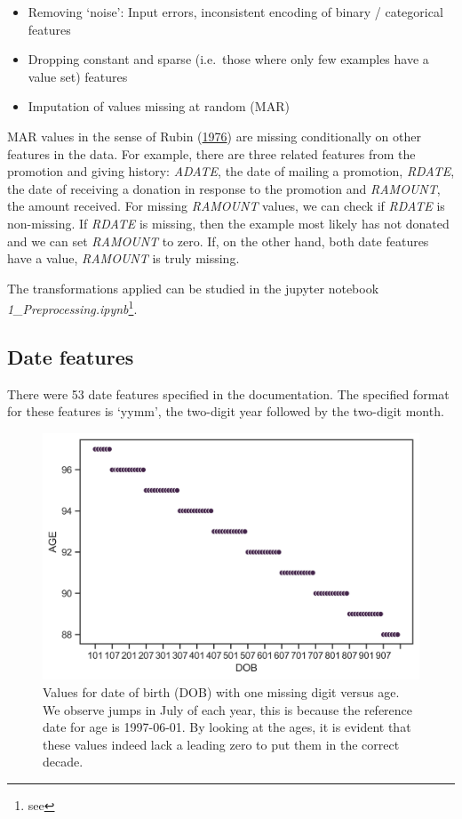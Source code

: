 \documentclass[
  11pt,
  a4paper,
  DIV=12,captions=tableheading,oneside]{scrbook}
\providecommand{\tightlist}{%
  \setlength{\itemsep}{0pt}\setlength{\parskip}{0pt}}
\providecommand{\tightlist}{%
  \setlength{\itemsep}{0pt}\setlength{\parskip}{0pt}}
\begin{document}
\begin{itemize}
\tightlist
\item
  Removing `noise': Input errors, inconsistent encoding of binary / categorical features
\item
  Dropping constant and sparse (i.e.~those where only few examples have a value set) features
\item
  Imputation of values missing at random (MAR)
\end{itemize}

MAR values in the sense of Rubin (\protect\hyperlink{ref-rubin1976inference}{1976}) are missing conditionally on other features in the data. For example, there are three related features from the promotion and giving history: \emph{ADATE}, the date of mailing a promotion, \emph{RDATE}, the date of receiving a donation in response to the promotion and \emph{RAMOUNT}, the amount received. For missing \emph{RAMOUNT} values, we can check if \emph{RDATE} is non-missing. If \emph{RDATE} is missing, then the example most likely has not donated and we can set \emph{RAMOUNT} to zero. If, on the other hand, both date features have a value, \emph{RAMOUNT} is truly missing.

The transformations applied can be studied in the jupyter notebook \emph{1\_Preprocessing.ipynb}\footnote{see }.

\hypertarget{date-features}{%
\subsection{Date features}\label{date-features}}

There were 53 date features specified in the documentation. The specified format for these features is `yymm', the two-digit year followed by the two-digit month.

\begin{figure}

{\centering \includegraphics[width=0.7\linewidth]{./figures/date-cleaning-1} 

}

\caption{Values for date of birth (DOB) with one missing digit versus age. We observe jumps in July of each year, this is because the reference date for age is 1997-06-01. By looking at the ages, it is evident that these values indeed lack a leading zero to put them in the correct decade.}\label{fig:date-cleaning}
\end{figure}
\end{document}
